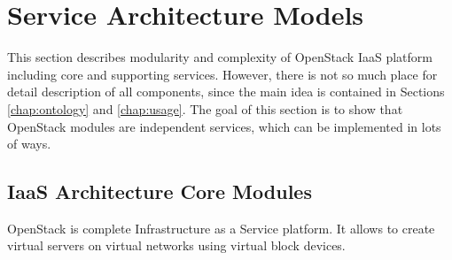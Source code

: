 
\section{Service Architecture Models}
\label{chap:service}



This section describes modularity and complexity of OpenStack IaaS platform including core and supporting services. However, there is not so much place for detail description of all components, since the main idea is contained in Sections \ref{chap:ontology} and \ref{chap:usage}. 
The goal of this section is to show that OpenStack modules are independent services, which can be implemented in lots of ways. 

\subsection{IaaS Architecture Core Modules}

OpenStack is complete Infrastructure as a Service platform. It allows to create virtual servers on virtual networks using virtual block devices.

